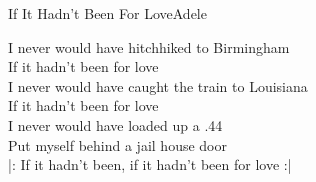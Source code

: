 \begin{song}{If It Hadn't Been For Love}{Adele}

\begin{guitar}
I never would have hitchhiked to Birmingham\\
If it hadn't been for love\\
I never would have caught the train to Louisiana\\
If it hadn't been for love\\
I never would have loaded up a .44\\
Put myself behind a jail house door\\
|: If it hadn't been, if it hadn't been for love :|\\
\end{guitar}

\end{song}
